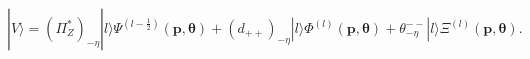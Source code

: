 \begin{equation}
 |V\rangle=
(\Pi^*_Z)_{-\eta}|l\rangle\Psi^{(l-\frac{1}{2})}(\boldsymbol p,\boldsymbol\theta)
+(d_{++})_{-\eta}|l\rangle\Phi^{(l)}(\boldsymbol p,\boldsymbol\theta)
+\theta^{--}_{-\eta}|l\rangle\Xi^{(l)}(\boldsymbol p,\boldsymbol\theta).
\end{equation}

